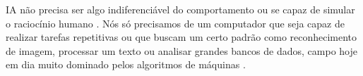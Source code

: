IA não precisa ser algo indiferenciável do comportamento ou se capaz de simular o raciocínio humano \cite{verganti2020innovation}. Nós só precisamos de um computador que seja capaz de realizar tarefas repetitivas ou que buscam um certo padrão como reconhecimento de imagem, processar um texto ou analisar grandes bancos de dados, campo hoje em dia muito dominado pelos algoritmos de máquinas \cite{verganti2020innovation, chen_artificial_2019}.
